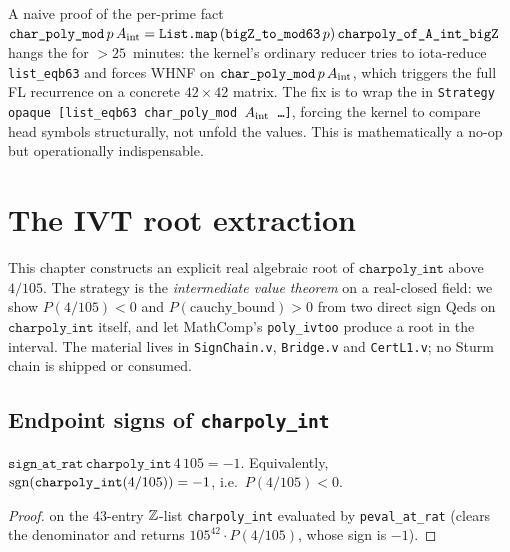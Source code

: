 \begin{remark}
\label{rem:strategy_opaque}
A naive proof of the per-prime fact
$\texttt{char\_poly\_mod}\,p\,A_{\mathrm{int}}
   = \texttt{List.map}\,(\texttt{bigZ\_to\_mod63}\,p)\,
       \texttt{charpoly\_of\_A\_int\_bigZ}$
hangs the \Qed{} for $> 25$~minutes: the kernel's ordinary reducer
tries to iota-reduce \texttt{list\_eqb63} and forces WHNF on
$\texttt{char\_poly\_mod}\,p\,A_{\mathrm{int}}$, which triggers the full FL
recurrence on a concrete $42 \times 42$ matrix. The fix is to wrap
the \Qed{} in
\texttt{Strategy opaque [list\_eqb63 char\_poly\_mod $A_{\mathrm{int}}$ \ldots]},
forcing the kernel to compare head symbols structurally, not unfold
the values. This is mathematically a no-op but operationally
indispensable.
\end{remark}

\chapter{The IVT root extraction}\label{ch:sturm}

This chapter constructs an explicit real algebraic root of
$\texttt{charpoly\_int}$ above $4/105$. The strategy is the
\emph{intermediate value theorem} on a real-closed field: we show
$P(4/105) < 0$ and $P(\text{cauchy\_bound}) > 0$ from two direct
\vmcompute{} sign Qeds on $\texttt{charpoly\_int}$ itself, and let
MathComp's \texttt{poly\_ivtoo} produce a root in the interval. The
material lives in \texttt{SignChain.v}, \texttt{Bridge.v} and
\texttt{CertL1.v}; no Sturm chain is shipped or consumed.

\section{Endpoint signs of \texttt{charpoly\_int}}

\begin{lemma}[Sign at $4/105$]\label{lem:signs_at_x0}
\rocqok
$\texttt{sign\_at\_rat}\,\texttt{charpoly\_int}\,4\,105 = -1$.
Equivalently, $\operatorname{sgn}(\texttt{charpoly\_int}(4/105)) = -1$, i.e.\
$P(4/105) < 0$.
\end{lemma}
\begin{proof}\rocqok
\vmcompute{} on the $43$-entry $\mathbb{Z}$-list \texttt{charpoly\_int}
evaluated by \texttt{peval\_at\_rat} (clears the denominator and
returns $105^{42}\cdot P(4/105)$, whose sign is $-1$).
\end{proof}

